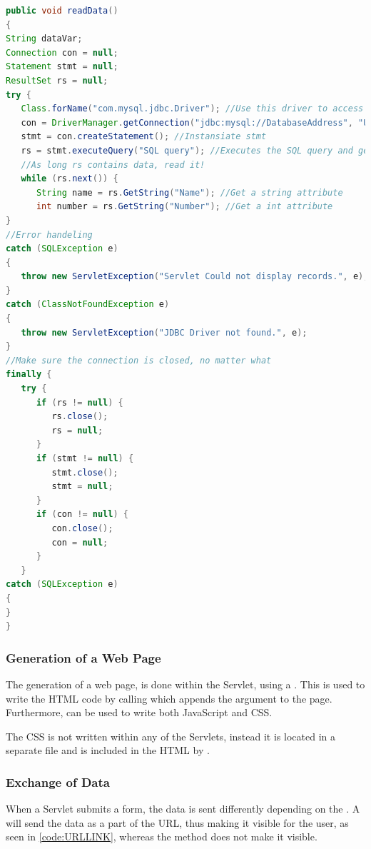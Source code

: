 \begin{lstlisting}[language=Java,label=code:readDatabase,caption=Code to read data from the database]
public void readData()
{
String dataVar;
Connection con = null;
Statement stmt = null;
ResultSet rs = null;
try {
   Class.forName("com.mysql.jdbc.Driver"); //Use this driver to access the database
   con = DriverManager.getConnection("jdbc:mysql://DatabaseAddress", "Username", "Password"); //Instansiate the connection
   stmt = con.createStatement(); //Instansiate stmt
   rs = stmt.executeQuery("SQL query"); //Executes the SQL query and get the result store in RS
   //As long rs contains data, read it!
   while (rs.next()) { 
      String name = rs.GetString("Name"); //Get a string attribute
      int number = rs.GetString("Number"); //Get a int attribute
}
//Error handeling
catch (SQLException e) 
{		
   throw new ServletException("Servlet Could not display records.", e);
} 
catch (ClassNotFoundException e) 
{			
   throw new ServletException("JDBC Driver not found.", e);
}
//Make sure the connection is closed, no matter what 
finally {
   try {
      if (rs != null) {
         rs.close();
         rs = null;
      }
      if (stmt != null) {
         stmt.close();
         stmt = null;
      }
      if (con != null) {
         con.close();
         con = null;
      }
   } 
catch (SQLException e) 
{			
}
}

\end{lstlisting}

\subsubsection{Generation of a Web Page}
The generation of a web page, is done within the Servlet, using a . This is used to write the HTML code by calling  which appends the argument to the page. Furthermore,  can be used to write both JavaScript and CSS.

The CSS is not written within any of the Servlets, instead it is located in a separate file and is included in the HTML by  .

\subsubsection{Exchange of Data}
When a Servlet submits a form, the data is sent differently depending on the . A  will send the data as a part of the URL, thus making it visible for the user, as seen in \autoref{code:URLLINK}, whereas the  method does not make it visible.

